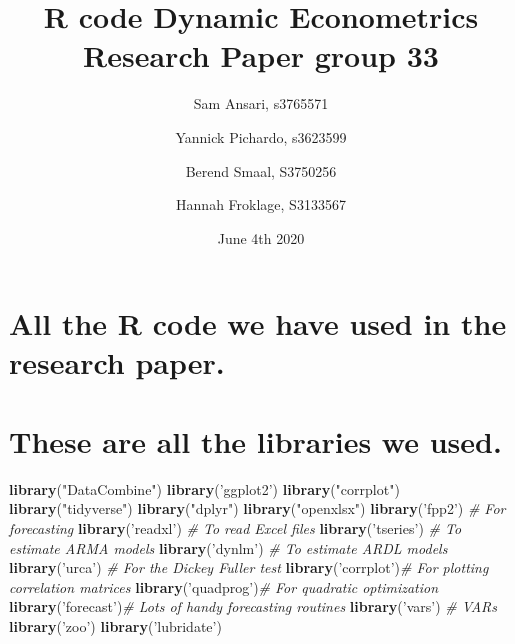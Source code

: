 \documentclass[]{article}
\title{R code Dynamic Econometrics Research Paper group 33}
\author{Sam Ansari, s3765571 \and Yannick Pichardo, s3623599 \and Berend Smaal, S3750256 \and Hannah Froklage, S3133567}
\date{June 4th 2020}
\newenvironment{Shaded}{\begin{snugshade}}{\end{snugshade}}
\newcommand{\KeywordTok}[1]{\textcolor[rgb]{0.13,0.29,0.53}{\textbf{#1}}}
\newcommand{\StringTok}[1]{\textcolor[rgb]{0.31,0.60,0.02}{#1}}
\newcommand{\CommentTok}[1]{\textcolor[rgb]{0.56,0.35,0.01}{\textit{#1}}}
\newcommand{\NormalTok}[1]{#1}
\begin{document}
\maketitle

\section{All the R code we have used in the research
paper.}\label{all-the-r-code-we-have-used-in-the-research-paper.}

\section{These are all the libraries we
used.}\label{these-are-all-the-libraries-we-used.}

\begin{Shaded}
\begin{Highlighting}[]
\KeywordTok{library}\NormalTok{(}\StringTok{"DataCombine"}\NormalTok{)}
\KeywordTok{library}\NormalTok{(}\StringTok{'ggplot2'}\NormalTok{)}
\KeywordTok{library}\NormalTok{(}\StringTok{"corrplot"}\NormalTok{)}
\KeywordTok{library}\NormalTok{(}\StringTok{"tidyverse"}\NormalTok{)}
\KeywordTok{library}\NormalTok{(}\StringTok{"dplyr"}\NormalTok{)}
\KeywordTok{library}\NormalTok{(}\StringTok{"openxlsx"}\NormalTok{)}
\KeywordTok{library}\NormalTok{(}\StringTok{'fpp2'}\NormalTok{)    }\CommentTok{# For forecasting}
\KeywordTok{library}\NormalTok{(}\StringTok{'readxl'}\NormalTok{)  }\CommentTok{# To read Excel files}
\KeywordTok{library}\NormalTok{(}\StringTok{'tseries'}\NormalTok{) }\CommentTok{# To estimate ARMA models}
\KeywordTok{library}\NormalTok{(}\StringTok{'dynlm'}\NormalTok{)   }\CommentTok{# To estimate ARDL models}
\KeywordTok{library}\NormalTok{(}\StringTok{'urca'}\NormalTok{)    }\CommentTok{# For the Dickey Fuller test}
\KeywordTok{library}\NormalTok{(}\StringTok{'corrplot'}\NormalTok{)}\CommentTok{# For plotting correlation matrices}
\KeywordTok{library}\NormalTok{(}\StringTok{'quadprog'}\NormalTok{)}\CommentTok{# For quadratic optimization}
\KeywordTok{library}\NormalTok{(}\StringTok{'forecast'}\NormalTok{)}\CommentTok{# Lots of handy forecasting routines}
\KeywordTok{library}\NormalTok{(}\StringTok{'vars'}\NormalTok{)    }\CommentTok{# VARs}
\KeywordTok{library}\NormalTok{(}\StringTok{'zoo'}\NormalTok{)   }
\KeywordTok{library}\NormalTok{(}\StringTok{'lubridate'}\NormalTok{)}
\end{Highlighting}
\end{Shaded}
\end{document}
